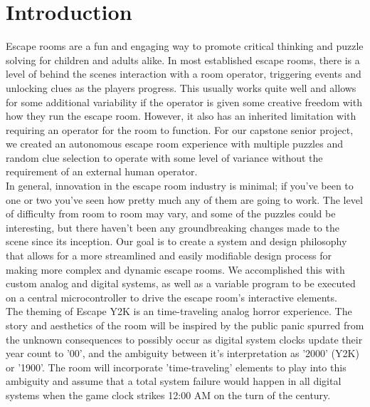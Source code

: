 \documentclass[conference]{IEEEtran}
\begin{document}
\section{Introduction}
Escape rooms are a fun and engaging way to promote critical thinking and puzzle solving for children and adults
alike. In most established escape rooms, there is a level of behind the scenes interaction with a room operator,
triggering events and unlocking clues as the players progress. This usually works quite well and allows for some
additional variability if the operator is given some creative freedom with how they run the escape room. However,
it also has an inherited limitation with requiring an operator for the room to function. For our capstone senior
project, we created an autonomous escape room experience with multiple puzzles and random clue selection to
operate with some level of variance without the requirement of an external human operator.
\\
\indent In general, innovation in the escape room industry is minimal; if you've been to one or two you've seen how
pretty much any of them are going to work. The level of difficulty from room to room may vary, and some of the
puzzles could be interesting, but there haven't been any groundbreaking changes made to the scene since its inception.
Our goal is to create a system and design philosophy that allows for a more streamlined and easily modifiable
design process for making more complex and dynamic escape rooms. We accomplished this with custom analog and digital
systems, as well as a variable program to be executed on a central microcontroller to drive the escape room's
interactive elements.
\\
\indent The theming of Escape Y2K is an time-traveling analog horror experience. The story and aesthetics of the room
will be inspired by the public panic spurred from the unknown consequences to possibly occur as digital system
clocks update their year count to '00', and the ambiguity between it's interpretation as '2000' (Y2K) or '1900'.
The room will incorporate 'time-traveling' elements to play into this ambiguity and assume that a total system
failure would happen in all digital systems when the game clock strikes 12:00 AM on the turn of the century.
\end{document}
